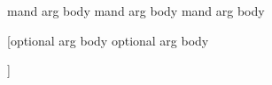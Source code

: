 \mycommand

{mand arg body
	mand arg body
	mand arg body

}%

[optional arg body
	optional arg body

]